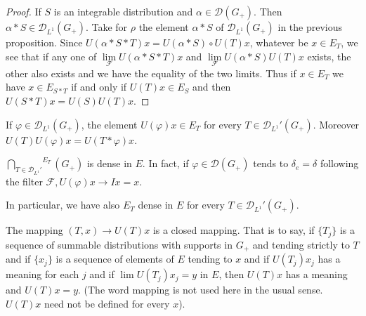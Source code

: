 \begin{proof}
If $S$ is an integrable distribution and $\alpha\in\mathscr{D}
(G_+)$. Then $\alpha *S\in\mathscr{D}_{L^1}(G_+)$. Take for $\rho$ the
element $\alpha *S$ of $\mathscr{D}_{L^1}(G_+)$ in the previous
proposition. Since $U(\alpha *S*T)x=U(\alpha *S)\circ U(T)x$, whatever
be $x\in E_T$, we see that if any one of $\lim\limits_{\mathscr{F}}
U(\alpha *S*T)x$ and $\lim\limits_{\mathscr{F}}U(\alpha *S)U(T)x$
exists, the other also exists and we have the equality of the two
limits. Thus if $x\in E_T$ we have $x\in E_{S*T}$ if and only if
$U(T)x\in E_S$ and then $U(S*T)x=U(S)U(T)x$. 
\end{proof}

\setcounter{cor}{0}
\begin{cor}\label{chap19:cor1}
If $\varphi\in\mathscr{D}_{L^1}(G_+)$, the element $U(\varphi)x\in
E_T$ for every $T\in\mathscr{D}_{L^1}'(G_+)$. Moreover $U(T)
U(\varphi)x=U(T*\varphi)x$.
\end{cor}
\begin{cor}\label{chap19:cor2}
${\bigcap\limits_{T\in\mathscr{D}_{L^1}'}}^{E_T}(G_+)$ is dense in
  $E$. In fact, if $\varphi\in\mathscr{D}(G_+)$ tends to
  $\delta_e=\delta$ following the filter $\mathscr{F},U(\varphi)x\to
  Ix=x$. 

\noindent In particular, we have also $E_T$ dense in $E$ for every
$T\in \mathscr{D}_{L^1}'(G_+)$. 
\end{cor}

\begin{prop}\label{chap19:prop19.2}
The mapping $(T,x)\to U(T)x$ is a closed mapping. That is to say, if
$\{T_j\}$ is a sequence of summable distributions with supports in
$G_+$ and tending strictly to $T$ and if $\{x_j\}$ is a sequence of
elements of $E$ tending to $x$ and if $U(T_j)x_j$ has a meaning for
each $j$ and if $\lim U(T_j)x_j=y$ in $E$, then $U(T)x$ has a meaning
and $U(T)x=y$. (The word mapping is not used here in the usual
sense. $U(T)x$ need not be defined for every $x$).
\end{prop}

